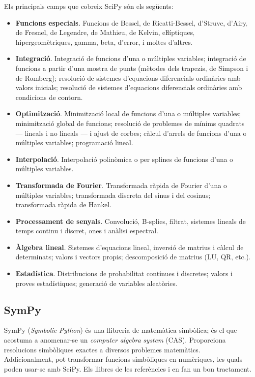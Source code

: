 Els principals camps  que cobreix SciPy són els següents:
\begin{itemize}
	\item \textbf{Funcions especials}. Funcions de Bessel, de Ricatti-Bessel, d'Struve,  d'Airy, de Fresnel, de Legendre, de Mathieu, de Kelvin, eŀlíptiques, hipergeomètriques, gamma, beta, d'error,  i moltes d'altres.
	\item \textbf{Integració}. Integració de funcions d'una o múltiples variables; integració de funcions a partir d'una mostra de punts (mètodes dels trapezis, de Simpson i de Romberg); resolució de sistemes d'equacions diferencials ordinàries amb valors inicials; resolució de sistemes d'equacions diferencials ordinàries amb condicions de contorn.
	\item \textbf{Optimització}. Minimització local de funcions d'una o múltiples variables; minimització global de funcions; resolució de problemes de mínims quadrats --- lineals i no lineals --- i ajust de corbes; càlcul d'arrels de funcions d'una o múltiples variables;  programació lineal.
	\item \textbf{Interpolació}. Interpolació polinòmica o per splines de funcions d'una o múltiples variables.
	\item \textbf{Transformada de Fourier}. Transformada ràpida de Fourier d'una o múltiples variables; transformada discreta del sinus i del cosinus; transformada ràpida de Hankel.
	\item \textbf{Processament de senyals}. Convolució, B-splies, filtrat, sistemes lineals de temps continu i discret, ones i anàlisi espectral.
	\item \textbf{Àlgebra lineal}. Sistemes d'equacions lineal, inversió de matrius i càlcul de determinats; valors i vectors propis; descomposició de matrius (LU, QR, etc.).
	\item \textbf{Estadística}. Distribucions de probabilitat contínues i discretes; valors i proves estadístiques; generació de variables aleatòries.
\end{itemize}


\subsection{SymPy}

SymPy (\textit{Symbolic Python}) és una llibreria de matemàtica simbòlica; és el que acostuma a anomenar-se un \textit{computer algebra system} (CAS). Proporciona resolucions simbòliques exactes a diversos problemes matemàtics. Addicionalment, pot transformar funcions simbòliques en numèriques, les quals poden usar-se amb SciPy. Els llibres de les referències \cite{JOH} i \cite{HIL} en fan un bon tractament.

